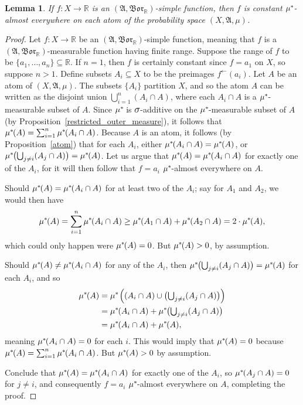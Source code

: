 \documentclass[
twoside=true,
paper=letter,
fontsize=9pt,
pagesize=auto,
leqno,
openany,
headsepline,
overfullrule,
]{scrbook}
\theoremstyle{plain}
\theoremstyle{plain}
\newtheorem{lemma}[thm]{Lemma}
\theoremstyle{definition}
\theoremstyle{bfnoteitalic}
\theoremstyle{bfnoteroman}
\newcommand{\sigalg}[1]{\mathfrak{#1}}
\newcommand{\borel}{\mathfrak{Bor}}
\newcommand{\textsigma}{\hbox{\large{$\sigma$}}\kern-1pt}
\newcommand{\preimage}[1]{#1^{\leftarrow}}
\newcommand{\R}{\mathbb{R}}
\newcommand{\meets}{\cap}
\newcommand{\sigmaalgebra}{\sigalg{A}}
\newcommand{\kernast}{\ast\kern-1pt}
\newcommand{\Pstar}{\measure^\kernast}
\newcommand{\function}{f}
\newcommand{\measurespace}{X}
\newcommand{\measure}{\mu}
\begin{document}
\begin{lemma}\label{atom_lemma}
If $\function:\measurespace\to\R$ is an $(\sigmaalgebra, \borel_\R)$-simple function, then $\function$ is constant 
$\Pstar$-almost everywhere
on each atom of the probability space $(\measurespace, \sigmaalgebra,\measure)$.
\end{lemma}

\begin{proof}
Let $\function:\measurespace\to\R$ be an $(\sigmaalgebra, \borel_\R)$-simple function, meaning that $\function$ is a $(\sigmaalgebra,\borel_\R)$\hyp{}measurable function having finite range. Suppose the range of $\function$ to be $\{a_1,\ldots,a_n\}\subseteq\R$. If $n=1$, then $\function$ is certainly constant since $\function=a_1$ on $\measurespace$, so suppose $n>1$.  Define subsets 
$A_i\subseteq\measurespace$ to be the preimages $\preimage{\function}(a_i)$.  
Let $A$ be an atom of $(\measurespace, \sigmaalgebra,\measure)$. 
The subsets $\{A_i\}$ partition $\measurespace$, and so the atom $A$ can be written as the disjoint union 
$\bigcup_{i=1}^n(A_i\meets A)$, where
\newcommand{\asubimeetsa}{A_i\meets A}
each $\asubimeetsa$ is a $\Pstar$-measurable subset of $A$. 
Since $\Pstar$ is $\textsigma$-additive on the $\Pstar$-measurable subset of $A$ (by Proposition~\ref{restricted_outer_measure}), it follows that 
$\Pstar(A)=\sum_{i=1}^n\Pstar(\asubimeetsa)$.
Because $A$ is an atom, it follows (by Proposition~\ref{atom}) that for each $A_i$, either $\Pstar(\asubimeetsa)=\Pstar(A)$, or 
$\Pstar\bigl(\bigcup_{j\neq i}(A_j\meets A)\bigr) = \Pstar(A)$.
Let us argue that $\Pstar(A) = \Pstar(\asubimeetsa)$ for exactly one of the $A_i$, for it will then follow that $\function = a_i$ $\Pstar$-almost everywhere on $A$.

Should $\Pstar(A) = \Pstar(\asubimeetsa)$ for at least two of the $A_i$; say for $A_1$ and $A_2$, we would then have
\[
\Pstar(A)=\sum_{i=1}^n \Pstar(\asubimeetsa)
\geq
\Pstar(A_1\meets A) + \Pstar(A_2\meets A)
=
2\cdot\Pstar(A),
\]
which could only happen were $\Pstar(A)=0$. But $\Pstar(A)>0$, by assumption.

Should $\Pstar(A) \neq \Pstar(\asubimeetsa)$ for any of the $A_i$, then 
$\Pstar\bigl(\bigcup_{j\neq i}(A_j\meets A)\bigr) = \Pstar(A)$ for each $A_i$, and so
\begin{align*}
\Pstar(A)
& = \Pstar\left((\asubimeetsa)
\cup
\bigl({\textstyle{\bigcup_{j\neq i}}}(A_j\meets A)\bigr)\right)\\
& = \Pstar(\asubimeetsa)
+
\Pstar\bigl( {\textstyle{\bigcup_{j\neq i}}}(A_j\meets A) \bigr)\\
& = \Pstar(\asubimeetsa) + \Pstar(A),\\
\end{align*}
meaning $\Pstar(\asubimeetsa) = 0$ for each $i$. This would imply that $\Pstar(A) = 0$ because 
$\Pstar(A)=\sum_{i=1}^n\Pstar(\asubimeetsa)$. But $\Pstar(A)>0$ by assumption.

Conclude that $\Pstar(A) = \Pstar(\asubimeetsa)$ for exactly one of the $A_i$, so $\Pstar(A_j\meets A)=0$ for $j\neq i$, and consequently $\function=a_i$ $\Pstar$-almost everywhere on $A$, completing the proof.
\end{proof}
\end{document}
